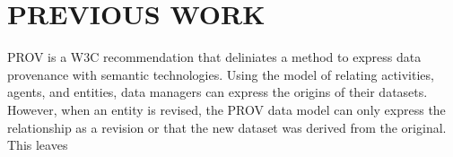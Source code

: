 
\chapter{PREVIOUS WORK}
PROV is a W3C recommendation that deliniates a method to express data provenance with semantic technologies.  Using the model of relating activities, agents, and entities, data managers can express the origins of their datasets.  However, when an entity is revised, the PROV data model can only express the relationship as a revision or that the new dataset was derived from the original.  This leaves



